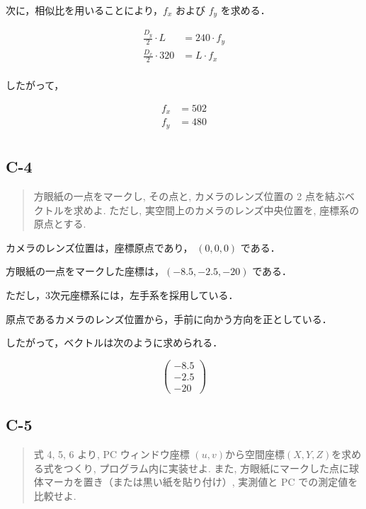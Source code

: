 \documentclass[fleqn, a4paper. 12pt]{jsarticle}
\begin{document}
    次に，相似比を用いることにより，$f_x$ および $f_y$ を求める．

    \begin{align*}
      \frac{D_y}{2} \cdot L &= 240 \cdot f_y \\
      \frac{D_x}{2} \cdot 320 &= L \cdot f_x \\
    \end{align*}

    したがって，

    \begin{align*}
      f_x &= 502 \\
      f_y &= 480 \\
    \end{align*}
      
  \subsection*{C-4}

    \begin{quote}
      方眼紙の一点をマークし, その点と, カメラのレンズ位置の 2 点を結ぶベクトルを求めよ. ただし, 実空間上のカメラのレンズ中央位置を, 座標系の原点とする.
    \end{quote}

    カメラのレンズ位置は，座標原点であり， \( (0, 0, 0) \) である．

    方眼紙の一点をマークした座標は，\( (-8.5, -2.5, -20) \) である．

    ただし，3次元座標系には，左手系を採用している．

    原点であるカメラのレンズ位置から，手前に向かう方向を正としている．

    したがって，ベクトルは次のように求められる．

    \[
      \begin{pmatrix}
        -8.5 \\
        -2.5 \\
        -20
      \end{pmatrix}
    \]

  \subsection*{C-5}

    \begin{quote}
      式 4, 5, 6 より, PC ウィンドウ座標 \( (u, v) \)から空間座標\( (X, Y, Z) \)を求める式をつくり, プログラム内に実装せよ. また, 方眼紙にマークした点に球体マーカを置き（または黒い紙を貼り付け）, 実測値と PC での測定値を比較せよ.
    \end{quote}
\end{document}
